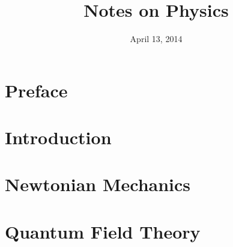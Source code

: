 \documentclass[oneside]{book}
\title{Notes on Physics}
\date{April 13, 2014}
\begin{document}
\frontmatter
\hypersetup{pageanchor=false}
\maketitle

\chapter{Preface}
\hypersetup{pageanchor=true}


\tableofcontents

\mainmatter
\chapter{Introduction}


\chapter{Newtonian Mechanics}


\chapter{Quantum Field Theory}


\backmatter
\appendix

\end{document}
